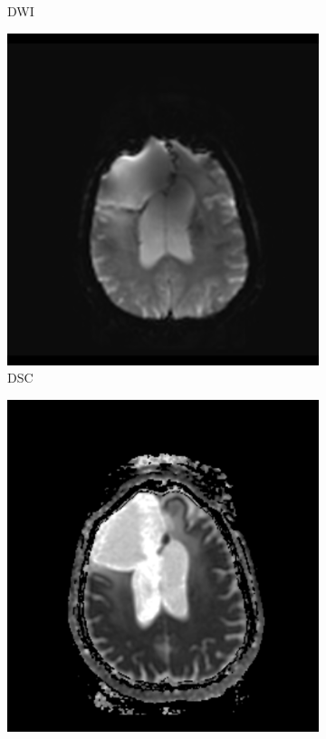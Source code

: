 \begin{figure}
\begin{subfigure}[t]{\figexamplewidth}
    \caption{\gls{DWI}}\label{fig:DWI}
\end{subfigure}
\begin{subfigure}[t]{\figexamplewidth}
    \centering
    \includegraphics[width=\textwidth]{Figures/DSC}
    \caption{\gls{DSC}}\label{fig:PWI-DSC}
\end{subfigure}
\begin{subfigure}[t]{\figexamplewidth}
    \centering
    \includegraphics[width=\textwidth]{Figures/DERIVED}

\end{subfigure}
\end{figure}
